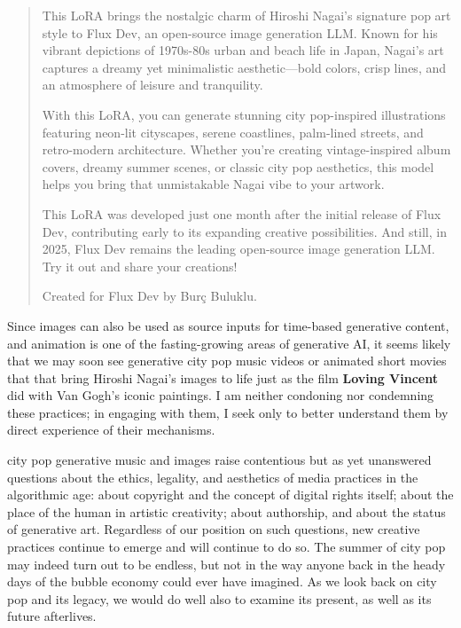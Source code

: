 \documentclass[
  letterpaper,
  DIV=11,
  numbers=noendperiod,
  oneside]{scrartcl}
\begin{document}
\begin{quote}
This LoRA brings the nostalgic charm of Hiroshi Nagai's signature pop
art style to Flux Dev, an open-source image generation LLM. Known for
his vibrant depictions of 1970s-80s urban and beach life in Japan,
Nagai's art captures a dreamy yet minimalistic aesthetic---bold colors,
crisp lines, and an atmosphere of leisure and tranquility.

With this LoRA, you can generate stunning city pop-inspired
illustrations featuring neon-lit cityscapes, serene coastlines,
palm-lined streets, and retro-modern architecture. Whether you're
creating vintage-inspired album covers, dreamy summer scenes, or classic
city pop aesthetics, this model helps you bring that unmistakable Nagai
vibe to your artwork.

This LoRA was developed just one month after the initial release of Flux
Dev, contributing early to its expanding creative possibilities. And
still, in 2025, Flux Dev remains the leading open-source image
generation LLM. Try it out and share your creations! 🚀

Created for Flux Dev by Burç Buluklu.
\end{quote}

Since images can also be used as source inputs for time-based generative
content, and animation is one of the fasting-growing areas of generative
AI, it seems likely that we may soon see generative city pop music
videos or animated short movies that that bring Hiroshi Nagai's images
to life just as the film \textbf{Loving Vincent} did with Van Gogh's
iconic paintings. I am neither condoning nor condemning these practices;
in engaging with them, I seek only to better understand them by direct
experience of their mechanisms.

city pop generative music and images raise contentious but as yet
unanswered questions about the ethics, legality, and aesthetics of media
practices in the algorithmic age: about copyright and the concept of
digital rights itself; about the place of the human in artistic
creativity; about authorship, and about the status of generative art.
Regardless of our position on such questions, new creative practices
continue to emerge and will continue to do so. The summer of city pop
may indeed turn out to be endless, but not in the way anyone back in the
heady days of the bubble economy could ever have imagined. As we look
back on city pop and its legacy, we would do well also to examine its
present, as well as its future afterlives.
\end{document}

